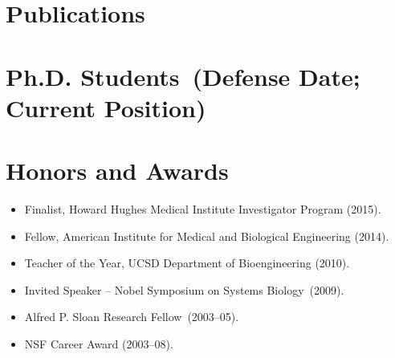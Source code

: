 \documentclass[11pt,a4paper,sans]{moderncv}        %
\makeatletter
\renewcommand*{\bibliographyitemlabel}{\@biblabel{\arabic{enumiv}}}
\makeatother
\begin{document}
\section{Publications} %
\vspace{-.2in}
\renewcommand{\refname}{}
\nocite{*}

    
\section{Ph.D. Students~(Defense Date; Current Position)}


\section{Honors and Awards}
\begin{itemize}

\item Finalist, Howard Hughes Medical Institute Investigator Program (2015). 

\item Fellow, American Institute for Medical and Biological Engineering (2014). 

\item Teacher of the Year, UCSD Department of Bioengineering (2010).

\item Invited Speaker -- Nobel Symposium on Systems Biology~(2009).

\item Alfred P. Sloan Research Fellow~(2003--05).

\item NSF Career Award (2003--08).

\end{itemize}
\end{document}
